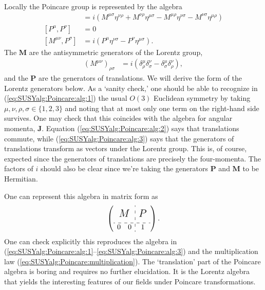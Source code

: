 \documentclass[12pt]{article}
\numberwithin{equation}{section}    %
\begin{document}
Locally the Poincare group is represented by the algebra
\begin{align}
	[M^{\mu\nu},M^{\rho\sigma}] &= i(M^{\mu\sigma}\eta^{\nu\rho}+ M^{\nu\rho}\eta^{\mu\sigma} - M^{\mu\rho}\eta^{\nu\sigma} - M^{\nu\sigma}\eta^{\mu\rho})\label{eq:SUSYalg:Poincare:alg:1}\\
	[P^\mu,P^\nu] &= 0\label{eq:SUSYalg:Poincare:alg:2}\\
	[M^{\mu\nu}, P^\sigma] &= i(P^\mu\eta^{\nu\sigma}-P^\nu\eta^{\mu\sigma}).\label{eq:SUSYalg:Poincare:alg:3}
\end{align}
The $\mathbf{M}$ are the antisymmetric generators of the Lorentz group,
\begin{align}
(M^{\mu\nu})_{\rho\sigma}&=i(\delta^\mu_\rho\delta^\nu_\sigma-\delta^\mu_\sigma\delta^\nu_\rho),\label{eq:SUSYalg:LorentzGenerators}
\end{align}
and the $\mathbf P$ are the generators of translations. We will derive the form of the Lorentz generators below. As a `sanity check,' one should be able to recognize in  (\ref{eq:SUSYalg:Poincare:alg:1}) the usual $O(3)$ Euclidean symmetry  by taking $\mu,\nu,\rho,\sigma \in \{1,2,3\}$ and noting that at most only one term on the right-hand side survives. One may check that this coincides with the algebra for angular momenta, $\mathbf J$.  Equation (\ref{eq:SUSYalg:Poincare:alg:2}) says that translations commute, while  (\ref{eq:SUSYalg:Poincare:alg:3}) says that the generators of translations transform as vectors under the Lorentz group. This is, of course, expected since the generators of translations are precisely the four-momenta. The factors of $i$ should also be clear since we're taking the generators $\mathbf{P}$ and $\mathbf{M}$ to be Hermitian. 

One can represent this algebra in matrix form as
\begin{align}
	\left(
	\begin{array}{cc:c}
	\multicolumn{2}{c:}{\multirow{2}{*}{\Large{$M$}}} & \multicolumn{1}{c}{\multirow{2}{*}{\Large{$P$}}} \\
	 &&  \\
	\hdashline
	0 & 0 & 1
	\end{array}
	\right).
\end{align}
One can check explicitly this reproduces the algebra in (\ref{eq:SUSYalg:Poincare:alg:1}--\ref{eq:SUSYalg:Poincare:alg:3}) and the multiplication law (\ref{eq:SUSYalg:Poincare:multiplication}).
%
The `translation' part of the Poincare algebra is boring and requires no further elucidation. It is the Lorentz algebra that yields the interesting features of our fields under Poincare transformations.
\end{document}
